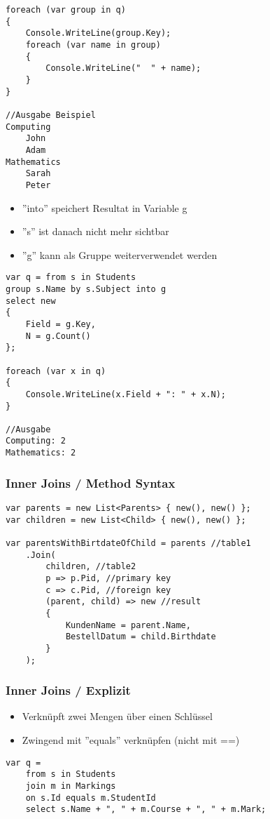 \begin{multicols*}{2}
\begin{lstlisting}
foreach (var group in q)
{
    Console.WriteLine(group.Key);
    foreach (var name in group)
    {
        Console.WriteLine("  " + name);
    }
}

//Ausgabe Beispiel
Computing
    John
    Adam
Mathematics
    Sarah
    Peter
\end{lstlisting}
\begin{itemize}
    \item ''into'' speichert Resultat in Variable g
    \item ''s'' ist danach nicht mehr sichtbar
    \item ''g'' kann als Gruppe weiterverwendet werden
\end{itemize}
\begin{lstlisting}
var q = from s in Students
group s.Name by s.Subject into g
select new
{ 
    Field = g.Key,
    N = g.Count()
};

foreach (var x in q)
{
    Console.WriteLine(x.Field + ": " + x.N); 
}

//Ausgabe
Computing: 2 
Mathematics: 2
\end{lstlisting}
\subsubsection{Inner Joins / Method Syntax}
\begin{lstlisting}
var parents = new List<Parents> { new(), new() };
var children = new List<Child> { new(), new() };

var parentsWithBirtdateOfChild = parents //table1
    .Join(
        children, //table2
        p => p.Pid, //primary key
        c => c.Pid, //foreign key
        (parent, child) => new //result
        {
            KundenName = parent.Name,
            BestellDatum = child.Birthdate
        }
    );
\end{lstlisting}
\subsubsection{Inner Joins / Explizit}
\begin{itemize}
    \item Verknüpft zwei Mengen über einen Schlüssel
    \item Zwingend mit ''equals'' verknüpfen (nicht mit ==)
\end{itemize}
\begin{lstlisting}
var q =
    from s in Students
    join m in Markings
    on s.Id equals m.StudentId
    select s.Name + ", " + m.Course + ", " + m.Mark;


\end{lstlisting}
\end{multicols*}
